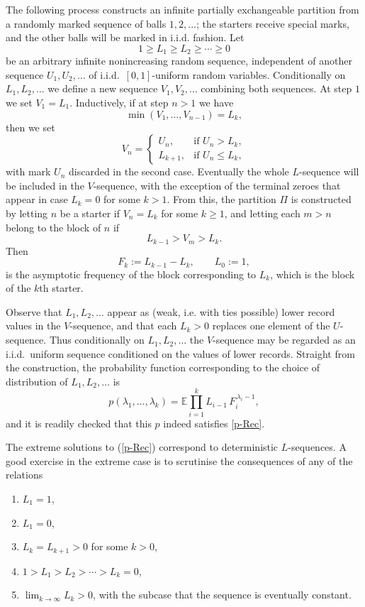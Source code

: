 \documentclass{article}
\begin{document}
The following process constructs an infinite partially exchangeable partition
from a randomly marked sequence of balls $1,2,\ldots$; the starters receive special marks, and the other balls will be marked in i.i.d. fashion.
Let
\[
1\ge L_1\ge L_2\ge\cdots\ge0
\]
be an arbitrary infinite nonincreasing random sequence, independent of another
sequence $U_1,U_2,\ldots$ of i.i.d.\ $[0,1]$-uniform random variables.
Conditionally on $L_1,L_2,\ldots$ we define a new sequence
$V_1,V_2,\ldots$ combining both sequences.
At step $1$ we set $V_1=L_1$.
Inductively, if at step $n>1$ we have
\[
\min(V_1,\ldots,V_{n-1})=L_k,
\]
then we set
\[
V_n=
\begin{cases}
U_n, &\text{if } U_n>L_k,\\
L_{k+1}, &\text{if } U_n\le L_k,
\end{cases}
\]
with mark $U_n$ discarded in the second case.
Eventually the whole $L$-sequence will be included in the $V$-sequence, with
the exception of the terminal zeroes that appear in case $L_k=0$ for some $k>1$.
From this,
the partition  $\Pi$ is constructed by letting $n$ be a starter if
$V_n=L_k$ for some $k\ge1$, and letting each $m>n$ belong to the block of $n$
if
\[L_{k-1}>V_m>L_k .\]
Then
\[F_k:=L_{k-1}-L_k,\qquad L_0:=1,\]
is the asymptotic frequency of the block corresponding to $L_k$, which is the block of the $k$th starter.

Observe that $L_1,L_2,\ldots$ appear as (weak, i.e. with ties possible) lower record values in the
$V$-sequence, and that each $L_k>0$ replaces one element of the $U$-sequence.
Thus conditionally on $L_1,L_2,\ldots$ the $V$-sequence may be regarded as an
i.i.d.\ uniform sequence conditioned on the values of lower records.
Straight from the construction, the probability function corresponding to the
choice of distribution of $L_1,L_2,\ldots$ is
\begin{equation}\label{PErep}
p(\lambda_1,\ldots,\lambda_k)
=
{\mathbb E}\prod_{i=1}^k
L_{i-1}\,F_i^{\,\lambda_i-1},
\end{equation}
and it is readily checked that this $p$ indeed satisfies \eqref{p-Rec}.




The extreme solutions to (\ref{p-Rec}) correspond  to deterministic $L$-sequences.
A good exercise in the extreme case is to scrutinise the consequences of any of the relations
\begin{enumerate}
\item[(a)] $L_1=1$,
\item[(b)] $L_1=0$,
\item[(c)] $L_k=L_{k+1}>0$ for some $k>0$,
\item[(d)] $1>L_1>L_2>\cdots>L_k=0$,
\item[(e)] $\lim_{k\to\infty}L_k>0$, with the subcase that the sequence is eventually constant.
\end{enumerate}
\end{document}
